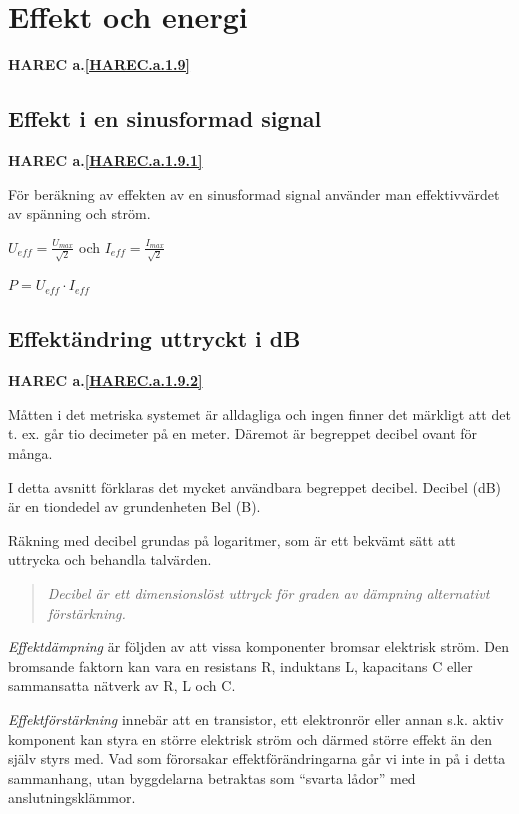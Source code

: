\section{Effekt och energi}
\textbf{HAREC a.\ref{HAREC.a.1.9}\label{myHAREC.a.1.9}}
\label{effect och energi}

\subsection{Effekt i en sinusformad signal}
\textbf{HAREC a.\ref{HAREC.a.1.9.1}\label{myHAREC.a.1.9.1}}

För beräkning av effekten av en sinusformad signal använder man effektivvärdet
av spänning och ström.

\(U_{eff} = \frac{U_{max}}{\sqrt{2}}\) och \(I_{eff} = \frac{I_{max}}{\sqrt{2}}\)

\(P = U_{eff} \cdot I_{eff}\)

\subsection{Effektändring uttryckt i dB}
\textbf{HAREC a.\ref{HAREC.a.1.9.2}\label{myHAREC.a.1.9.2}}

Måtten i det metriska systemet är alldagliga och ingen finner det märkligt att
det t. ex. går tio decimeter på en meter. Däremot är begreppet decibel ovant för
många.

I detta avsnitt förklaras det mycket användbara begreppet decibel. Decibel (dB)
är en tiondedel av grundenheten Bel (B).

Räkning med decibel grundas på logaritmer, som är ett bekvämt sätt att uttrycka
och behandla talvärden.

\begin{quote}\emph{
Decibel är ett dimensionslöst uttryck för graden av dämpning alternativt
förstärkning.
}\end{quote}

\emph{Effektdämpning} är följden av att vissa komponenter bromsar elektrisk ström. Den
bromsande faktorn kan vara en resistans R, induktans L, kapacitans C eller
sammansatta nätverk av R, L och C.

\emph{Effektförstärkning} innebär att en transistor, ett elektronrör eller annan s.k.
aktiv komponent kan styra en större elektrisk ström och därmed större effekt än
den själv styrs med. Vad som förorsakar effektförändringarna går vi inte in på i
detta sammanhang, utan byggdelarna betraktas som ``svarta lådor'' med
anslutningsklämmor.


